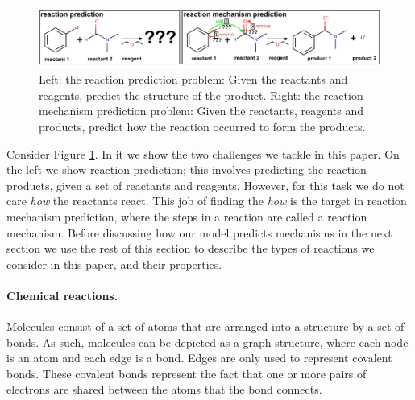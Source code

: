 

\begin{figure}[t!]
\centering
\includegraphics[width=\textwidth]{reaction_diagram}
\caption{Left: the reaction prediction problem: Given the reactants and reagents, predict the structure of the product. Right: the reaction mechanism prediction problem: Given the reactants, reagents and products, predict how the reaction occurred to form the products.}
\label{fig:task-overview}
\end{figure}


Consider Figure \ref{fig:task-overview}. In it we show the two challenges we tackle in this paper. 
On the left we show reaction prediction; this involves predicting the reaction products, given a set of reactants and reagents. However, for this task we do not care {\em how} the reactants react.
 This job of finding the {\em how} is the target in reaction mechanism prediction, where the steps in a reaction are called a reaction mechanism.
 Before discussing how our model predicts mechanisms in the next section we use the rest of this section to describe the types of reactions we consider in this paper, and their properties.

\paragraph{Chemical reactions.}

Molecules consist of a set of atoms that are arranged into a structure by a set of bonds. 
As such, molecules can be depicted as a graph structure, where each node is an atom and each edge is a bond.
Edges are only used to represent covalent bonds. 
These covalent bonds %
represent the fact that one or more pairs of electrons are shared between the atoms that the bond connects. 

